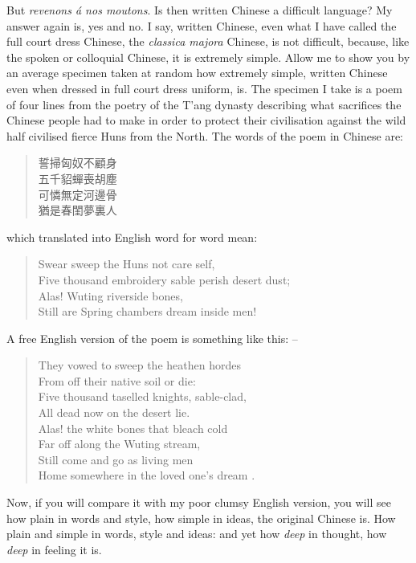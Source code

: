 But \emph{revenons \'a nos moutons}. Is then written Chinese a difficult language?
My answer again is, yes and no. I say, written Chinese,
even what I have called the full court dress Chinese,
the \emph{classica majora} Chinese, is not difficult,
because, like the spoken or colloquial Chinese,
it is extremely simple.
Allow me to show you by an average specimen taken at random how extremely simple,
written Chinese even when dressed in full court dress uniform, is.
The specimen I take is a poem of four lines from the poetry of the T'ang dynasty describing
what sacrifices the Chinese people had to make in order to protect their civilisation
against the wild half civilised fierce Huns from the North.
The words of the poem in Chinese are:
\begin{quote}
誓掃匈奴不顧身 \\
五千貂蟬喪胡塵 \\
可憐無定河邊骨 \\
猶是春閨夢裏人
\end{quote}
which translated into English word for word mean:
\begin{quote}
Swear sweep the Huns not care self, \\
Five thousand embroidery sable perish desert dust; \\
Alas! Wuting riverside bones, \\
Still are Spring chambers dream inside men!
\end{quote}
A free English version of the poem is something like this: --
\begin{quote}
They vowed to sweep the heathen hordes \\
From off their native soil or die: \\
Five thousand taselled knights, sable-clad, \\
All dead now on the desert lie. \\
Alas! the white bones that bleach cold \\
Far off along the Wuting stream, \\
Still come and go as living men \\
Home somewhere in the loved one's dream .
\end{quote}
Now, if you will compare it with my poor clumsy English version,
you will see how plain in words and style,
how simple in ideas, the original Chinese is.
How plain and simple in words, style and ideas:
and yet how \emph{deep} in thought, how \emph{deep} in feeling it is.

